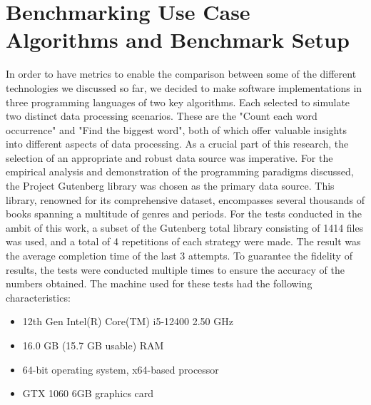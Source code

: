 

\lstset{basicstyle=\small\ttfamily, breaklines=true, frame=single}
\chapter{Benchmarking Use Case Algorithms and Benchmark Setup}
\label{cha:benchmarking_use_case_algorithms}

In order to have metrics to enable the comparison between some of the different technologies we discussed so far, we decided to make software implementations in three programming languages of two key algorithms. 
Each selected to simulate two distinct data processing scenarios. These are the "Count each word occurrence" and "Find the biggest word", both of which offer valuable insights into different aspects of data processing.
As a crucial part of this research, the selection of an appropriate and robust data source was imperative. For the empirical analysis and demonstration of the programming paradigms discussed, the Project Gutenberg library \cite{gutenberg} was chosen as the primary data source. This library, renowned for its comprehensive dataset, encompasses several thousands of books spanning a multitude of genres and periods. For the tests conducted in the ambit of this work, a subset of the Gutenberg total library consisting of 1414 files was used, and a total of 4 repetitions of each strategy were made. The result was the average completion time of the last 3 attempts. To guarantee the fidelity of results, the tests were conducted multiple times to ensure the accuracy of the numbers obtained. The machine used for these tests had the following characteristics:

\begin{itemize}
    \item 12th Gen Intel(R) Core(TM) i5-12400 2.50 GHz
    \item 16.0 GB (15.7 GB usable) RAM
    \item 64-bit operating system, x64-based processor
    \item GTX 1060 6GB graphics card
\end{itemize}

